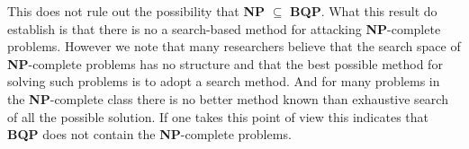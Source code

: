 This does not rule out the possibility that \textbf{NP} $\subseteq$ \textbf{BQP}. What this result do establish is that there is no a search-based method for attacking \textbf{NP}-complete problems.
However we note that many researchers believe that the search space of \textbf{NP}-complete problems has no structure and that the best possible method for solving such problems is to adopt a search method. And for many problems in the \textbf{NP}-complete class there is no better method known than exhaustive search of all the possible solution. If one takes this point of view this indicates that \textbf{BQP} does not contain the \textbf{NP}-complete problems.